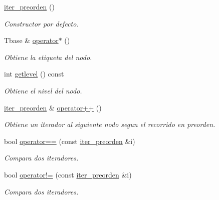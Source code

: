 \begin{DoxyCompactItemize}
\item 
\hypertarget{classArbolGeneral_1_1iter__preorden_a1630c38cc1bdba513fd6e850ae895455}{\hyperlink{classArbolGeneral_1_1iter__preorden_a1630c38cc1bdba513fd6e850ae895455}{iter\-\_\-preorden} ()}\label{classArbolGeneral_1_1iter__preorden_a1630c38cc1bdba513fd6e850ae895455}

\begin{DoxyCompactList}\small\item\em Constructor por defecto. \end{DoxyCompactList}\item 
\hypertarget{classArbolGeneral_1_1iter__preorden_a6b4d2151f1a69832c5278671ccb91ab2}{Tbase \& \hyperlink{classArbolGeneral_1_1iter__preorden_a6b4d2151f1a69832c5278671ccb91ab2}{operator$\ast$} ()}\label{classArbolGeneral_1_1iter__preorden_a6b4d2151f1a69832c5278671ccb91ab2}

\begin{DoxyCompactList}\small\item\em Obtiene la etiqueta del nodo. \end{DoxyCompactList}\item 
\hypertarget{classArbolGeneral_1_1iter__preorden_af7998e2c1051608ecb39ef3a7e5af589}{int \hyperlink{classArbolGeneral_1_1iter__preorden_af7998e2c1051608ecb39ef3a7e5af589}{getlevel} () const }\label{classArbolGeneral_1_1iter__preorden_af7998e2c1051608ecb39ef3a7e5af589}

\begin{DoxyCompactList}\small\item\em Obtiene el nivel del nodo. \end{DoxyCompactList}\item 
\hypertarget{classArbolGeneral_1_1iter__preorden_ad99644bea6d9c67c58ff0b22fe7780d0}{\hyperlink{classArbolGeneral_1_1iter__preorden}{iter\-\_\-preorden} \& \hyperlink{classArbolGeneral_1_1iter__preorden_ad99644bea6d9c67c58ff0b22fe7780d0}{operator++} ()}\label{classArbolGeneral_1_1iter__preorden_ad99644bea6d9c67c58ff0b22fe7780d0}

\begin{DoxyCompactList}\small\item\em Obtiene un iterador al siguiente nodo segun el recorrido en preorden. \end{DoxyCompactList}\item 
bool \hyperlink{classArbolGeneral_1_1iter__preorden_a4d873c6d6af1cb848c356011f2912021}{operator==} (const \hyperlink{classArbolGeneral_1_1iter__preorden}{iter\-\_\-preorden} \&i)
\begin{DoxyCompactList}\small\item\em Compara dos iteradores. \end{DoxyCompactList}\item 
bool \hyperlink{classArbolGeneral_1_1iter__preorden_a7965aad2dbd42a8fad8d25b711e1b589}{operator!=} (const \hyperlink{classArbolGeneral_1_1iter__preorden}{iter\-\_\-preorden} \&i)
\begin{DoxyCompactList}\small\item\em Compara dos iteradores. \end{DoxyCompactList}\end{DoxyCompactItemize}

